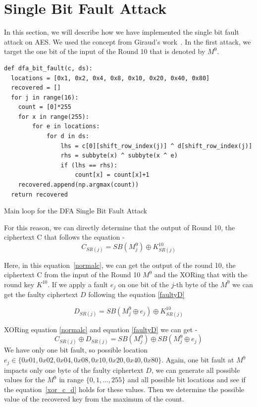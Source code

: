 \documentclass{article}
\begin{document}
\section{Single Bit Fault Attack}
In this section, we will describe how we have implemented the single bit fault attack on AES. We used the concept from Giraud's work~\cite{giraud2004dfa}. In the first attack, we target the one bit of the input of the Round 10 that is denoted by $M^9$.
\begin{listing}[H]
\begin{verbatim}
def dfa_bit_fault(c, ds):
  locations = [0x1, 0x2, 0x4, 0x8, 0x10, 0x20, 0x40, 0x80]
  recovered = []
  for j in range(16):
    count = [0]*255
    for x in range(255):
        for e in locations:
            for d in ds:
                lhs = c[0][shift_row_index(j)] ^ d[shift_row_index(j)]
                rhs = subbyte(x) ^ subbyte(x ^ e)
                if (lhs == rhs):
                    count[x] = count[x]+1
    recovered.append(np.argmax(count))
  return recovered    
\end{verbatim}
	\caption{Main loop for the DFA Single Bit Fault Attack}
	\label{single-bit-fault}
\end{listing}

For this reason, we can directly determine that the output of Round 10, the ciphertext C that follows the equation - 
\begin{equation}
C_{SR(j)} = SB(M^9_j) \oplus K^{10}_{SR(j)}
\label{normalc}
\end{equation}


Here, in this equation~\ref{normalc}, we can get the output of the round 10, the ciphertext C from the input of the Round 10 $M^9$ and the XORing that with the round key $K^{10}$. If we apply a fault $e_j$ on one bit of the $j$-th byte of the $M^9$ we can get the faulty ciphertext $D$ following the equation \ref{faultyD}

\begin{equation}
	D_{SR(j)} = SB(M^9_j \oplus e_j) \oplus K^{10}_{SR(j)}\label{faultyD}
\end{equation}

XORing equation \ref{normalc} and equation \ref{faultyD} we can get - 
\begin{equation}
C_{SR(j)}  \oplus	D_{SR(j)} = SB(M^9_j)   \oplus SB(M^9_j \oplus e_j)   \label{xor_c_d}
\end{equation}
We have only one bit fault, so possible location $e_j \in \{0x01, 0x02, 0x04,0x08,0x10,0x20,0x40,0x80\}$. Again, one bit fault at $M^9$ impacts only one byte of the faulty ciphertext $D$, we can generate all possible values for the $M^9$ in range $\{0,1,\ldots, 255\}$ and all possible bit locations and see if the equation~\ref{xor_c_d} holds for these values. Then we determine the possible value of the recovered key from the maximum of the count. 
\end{document}
